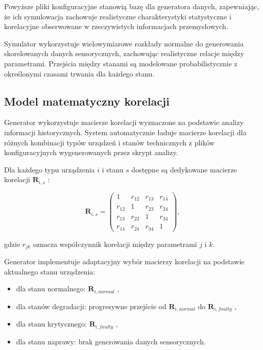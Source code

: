 \vspace{0.3em}

Powyższe pliki konfiguracyjne stanowią bazę dla generatora danych, zapewniając, że ich symulowacja zachowuje realistyczne charakterystyki statystyczne i korelacyjne obserwowane w rzeczywistych informacjach przemysłowych.

Symulator wykorzystuje wielowymiarowe rozkłady normalne do generowania skorelowanych danych sensorycznych, zachowując realistyczne relacje między parametrami. Przejścia między stanami są modelowane probabilistycznie z określonymi czasami trwania dla każdego stanu.


\subsection{Model matematyczny korelacji}
\label{subsec:model_korelacji}

Generator wykorzystuje macierze korelacji wyznaczone na podstawie analizy informacji historycznych. System automatycznie ładuje macierze korelacji dla różnych kombinacji typów urządzeń i stanów technicznych z plików konfiguracyjnych wygenerowanych przez skrypt analizy.

Dla każdego typu urządzenia $i$ i stanu $s$ dostępne są dedykowane macierze korelacji $\mathbf{R}_{i,s}$ :

\begin{equation}
\mathbf{R}_{i,s} = \begin{pmatrix}
1 & r_{12} & r_{13} & r_{14} \\
r_{12} & 1 & r_{23} & r_{24} \\
r_{13} & r_{23} & 1 & r_{34} \\
r_{14} & r_{24} & r_{34} & 1
\end{pmatrix},
\end{equation}

gdzie $r_{jk}$ oznacza współczynnik korelacji między parametrami $j$ i $k$.

\vspace{0.3em}

Generator implementuje adaptacyjny wybór macierzy korelacji na podstawie aktualnego stanu urządzenia:
\begin{itemize}
    \item dla stanu normalnego: $\mathbf{R}_{i,normal}$ ,
    \item dla stanów degradacji: progresywne przejście od $\mathbf{R}_{i,normal}$ do $\mathbf{R}_{i,faulty}$ ,
    \item dla stanu krytycznego: $\mathbf{R}_{i,faulty}$ ,
    \item dla stanu naprawy: brak generowania danych sensorycznych.
\end{itemize}

